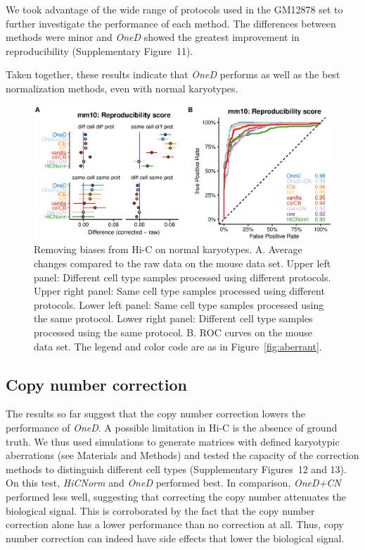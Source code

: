 \documentclass[a4,center,fleqn]{NAR}
\providecommand{\DIFadd}[1]{{\protect\color{red}#1}} %
\providecommand{\DIFdel}[1]{{\protect}}                      %
\providecommand{\DIFaddbegin}{} %
\providecommand{\DIFaddend}{} %
\providecommand{\DIFdelbegin}{} %
\providecommand{\DIFdelend}{} %
\begin{document}
We took advantage of the wide range of protocols used in the GM12878 set to
further investigate the performance of each method. The differences between
methods were minor and \textit{OneD} showed the greatest improvement in
reproducibility (Supplementary Figure~11).

Taken together, these results indicate that \textit{OneD} performs as well
as the best normalization methods, even with normal karyotypes.

\begin{figure}
\centerline{\includegraphics[width=.49\textwidth]{figure_3.eps}}
\caption{Removing biases from Hi-C on normal karyotypes. A. Average
  changes compared to the raw data on the mouse data set.
  Upper left panel: Different cell type samples
processed using different protocols. Upper right panel: Same cell
type samples processed using different protocols. Lower left panel:
Same cell type samples processed using the same protocol. Lower right panel:
Different cell type samples processed using the same protocol. B. ROC curves on
the mouse data set. The legend and color code are as in Figure~\ref{fig:aberrant}.}
\label{fig:normal}
\end{figure}


\subsection{Copy number correction}

The results so far suggest that the copy number correction lowers the
performance of \textit{OneD}. A possible limitation in Hi-C is the absence
of ground truth. We thus used simulations to generate matrices with
defined karyotypic aberrations (see Materials and Methods) and tested the
capacity of the correction methods to distinguish different cell types
(Supplementary \DIFdelbegin \DIFdel{Figure}\DIFdelend \DIFaddbegin \DIFadd{Figures}\DIFaddend ~12 \DIFaddbegin \DIFadd{and 13}\DIFaddend ). On this test, \textit{\DIFdelbegin \DIFdel{LGF}\DIFdelend \DIFaddbegin \DIFadd{HiCNorm}\DIFaddend } and \textit{OneD}
performed best. In comparison, \textit{OneD+CN} performed less well,
suggesting that correcting the copy number attenuates the biological
signal. This is corroborated by the fact that the copy number correction
alone has a lower performance than no correction at all. Thus, copy number
correction can indeed have side effects that lower the biological signal.
\end{document}
